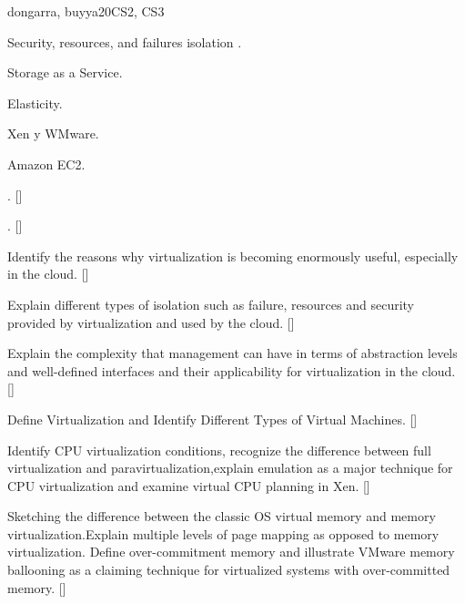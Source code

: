 \begin{syllabus}
\begin{unit}{\PDCloudComputing}{}{dongarra, buyya}{20}{CS2, CS3}
\begin{topics}
    \item \PDCloudComputingTopicVirtualization
    \item Security, resources, and failures isolation .
    \item Storage as a Service.
    \item Elasticity.
    \item Xen y WMware.
    \item Amazon EC2.
\end{topics}
\begin{learningoutcomes}
    \item \PDCloudComputingTopicVirtualization. [\Familiarity]
    \item \PDCloudComputingLOExplainTheDisadvantages. [\Familiarity]
    \item Identify the reasons why virtualization is becoming enormously useful, especially in the cloud. [\Familiarity]
    \item Explain different types of isolation such as failure, resources and security provided by virtualization and used by the cloud. [\Familiarity]
    \item Explain the complexity that management can have in terms of abstraction levels and well-defined interfaces and their applicability for virtualization in the cloud.  [\Familiarity]
    \item Define Virtualization and Identify Different Types of Virtual Machines. [\Familiarity]
    \item Identify CPU virtualization conditions, recognize the difference between full virtualization and  paravirtualization,explain emulation as a major technique for CPU virtualization and examine virtual CPU planning in Xen. [\Familiarity]
    \item Sketching the difference between the classic OS virtual memory and memory virtualization.Explain multiple levels of page mapping as opposed to memory virtualization. Define over-commitment memory and illustrate VMware memory ballooning as a claiming technique for virtualized systems with over-committed memory. [\Familiarity]
\end{learningoutcomes}
\end{unit}


\end{syllabus}
